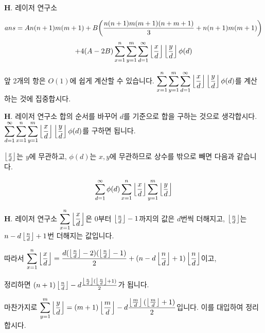 \begin{frame}{\textbf{H}. 레이저 연구소}
    

    $$ans= An(n+1)m(m+1) + B\bigg({n(n+1)m(m+1)(n+m+1) \over 3} + n(n+1)m(m+1)\bigg)$$
    $$+ 4(A-2B)\displaystyle \sum_{x=1}^{n} \displaystyle \sum_{y=1}^{m} \displaystyle \sum_{d=1}^{\infty} \left\lfloor{x \over d}\right\rfloor\left\lfloor{y \over d}\right\rfloor \phi(d)$$

    \vspace{18pt}

    앞 2개의 항은 $O(1)$에 쉽게 계산할 수 있습니다. $\displaystyle \sum_{x=1}^{n} \displaystyle \sum_{y=1}^{m} \displaystyle \sum_{d=1}^{\infty} \left\lfloor{x \over d}\right\rfloor\left\lfloor{y \over d}\right\rfloor \phi(d)$를 계산하는 것에 집중합시다.

\end{frame}

\begin{frame}{\textbf{H}. 레이저 연구소}
    합의 순서를 바꾸어 $d$를 기준으로 합을 구하는 것으로 생각합시다. $\displaystyle \sum_{d=1}^{\infty} \displaystyle \sum_{x=1}^{n} \displaystyle \sum_{y=1}^{m} \left\lfloor{x \over d}\right\rfloor\left\lfloor{y \over d}\right\rfloor \phi(d)$를 구하면 됩니다.

    \vspace{18pt}

    $\left\lfloor{x \over d}\right\rfloor$는 $y$에 무관하고, $\phi(d)$는 $x, y$에 무관하므로 상수를 밖으로 빼면 다음과 같습니다.

    \vspace{18pt}

    $$\displaystyle \sum_{d=1}^{\infty} \phi(d) \displaystyle \sum_{x=1}^{n} \left\lfloor{x \over d}\right\rfloor \displaystyle \sum_{y=1}^{m} \left\lfloor{y \over d}\right\rfloor$$
\end{frame}

\begin{frame}{\textbf{H}. 레이저 연구소}
    $\displaystyle \sum_{x=1}^{n} \left\lfloor{x \over d}\right\rfloor$은 $0$부터 $\left\lfloor{n \over d}\right\rfloor-1$까지의 값은 $d$번씩 더해지고, $\left\lfloor{n \over d}\right\rfloor$는 $n-d\left\lfloor{n \over d}\right\rfloor+1$번 더해지는 값입니다.
    
    \vspace{18pt}

    따라서 $\displaystyle \sum_{x=1}^{n} \left\lfloor{x \over d}\right\rfloor = {d(\left\lfloor{n \over d}\right\rfloor-2)(\left\lfloor{n \over d}\right\rfloor-1) \over 2} + (n-d\left\lfloor{n \over d}\right\rfloor+1)\left\lfloor{n \over d}\right\rfloor$이고, 
    
    정리하면 $(n+1)\left\lfloor{n \over d}\right\rfloor-d{\left\lfloor{n \over d}\right\rfloor(\left\lfloor{n \over d}\right\rfloor+1) \over 2}$가 됩니다.
    
    \vspace{18pt}
    
    마찬가지로 $\displaystyle \sum_{y=1}^{m} \left\lfloor{y \over d}\right\rfloor = (m+1)\left\lfloor{m \over d}\right\rfloor-d{\left\lfloor{m \over d}\right\rfloor(\left\lfloor{m \over d}\right\rfloor+1) \over 2}$입니다. 이를 대입하여 정리합시다.
\end{frame}

